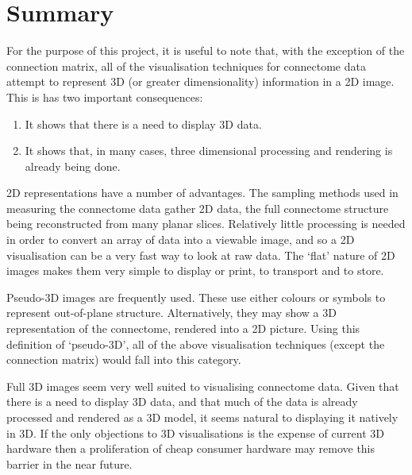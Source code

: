 \documentclass[MSc,paper=a4,pagesize=auto]{icldt}
\begin{document}
\section{Summary}
For the purpose of this project, it is useful to note that, with the exception of the connection matrix, all of the visualisation techniques for connectome data attempt to represent 3D (or greater dimensionality) information in a 2D image. This is has two important consequences:
\begin{enumerate}
\item It shows that there is a need to display 3D data.
\item It shows that, in many cases, three dimensional processing and rendering is already being done.
\end{enumerate}

2D representations have a number of advantages. The sampling methods used in measuring the connectome data gather 2D data, the full connectome structure being reconstructed from many planar slices. Relatively little processing is needed in order to convert an array of data into a viewable image, and so a 2D visualisation can be a very fast way to look at raw data. The ‘flat’ nature of 2D images makes them very simple to display or print, to transport and to store. 

Pseudo-3D images are frequently used. These use either colours or symbols to represent out-of-plane structure. Alternatively, they may show a 3D representation of the connectome, rendered into a 2D picture. Using this definition of ‘pseudo-3D’, all of the above visualisation techniques (except the connection matrix) would fall into this category. 

Full 3D images seem very well suited to visualising connectome data. Given that there is a need to display 3D data, and that much of the data is already processed and rendered as a 3D model, it seems natural to displaying it natively in 3D. If the only objections to 3D visualisations is the expense of current 3D hardware \cite{Margulies2013} then a proliferation of cheap consumer hardware may remove this barrier in the near future. 
\end{document}
